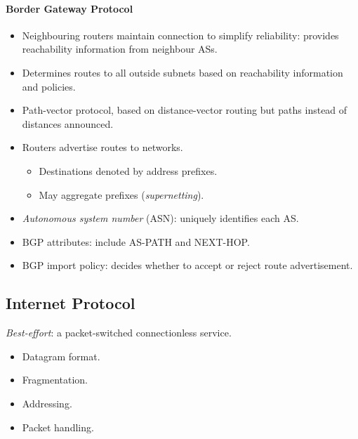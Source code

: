 \documentclass[twocolumn,english]{article}
\begin{document}
\paragraph{Border Gateway Protocol}
\begin{itemize}
\item Neighbouring routers maintain connection to simplify reliability:
provides reachability information from neighbour ASs.
\item Determines routes to all outside subnets based on reachability information
and policies.
\item Path-vector protocol, based on distance-vector routing but paths instead
of distances announced.
\item Routers advertise routes to networks.
\begin{itemize}
\item Destinations denoted by address prefixes.
\item May aggregate prefixes (\emph{supernetting}).
\end{itemize}
\item \emph{Autonomous system number} (ASN): uniquely identifies each AS.
\item BGP attributes: include AS-PATH and NEXT-HOP.
\item BGP import policy: decides whether to accept or reject route advertisement.
\end{itemize}

\subsection{Internet Protocol}

\emph{Best-effort}: a packet-switched connectionless service.
\begin{itemize}
\item Datagram format.
\item Fragmentation.
\item Addressing.
\item Packet handling.
\end{itemize}
\end{document}
